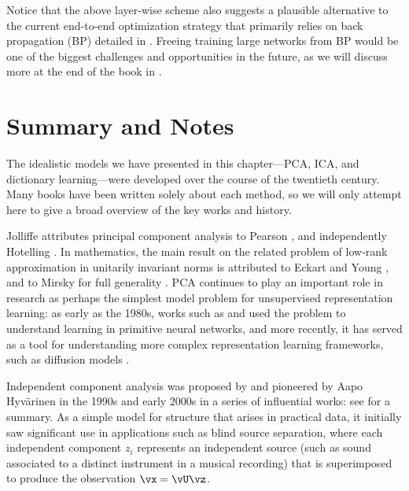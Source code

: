 \documentclass[../../book-main.tex]{subfiles}
\begin{document}
Notice that the above layer-wise scheme also suggests a plausible alternative to the current end-to-end optimization strategy that primarily relies on back propagation (BP) detailed in . Freeing training large networks from BP would be one of the biggest challenges and opportunities in the future, as we will discuss more at the end of the book in .


\section{Summary and Notes}

The idealistic models we have presented in this chapter---PCA, ICA, and
dictionary learning---were developed over the course of the twentieth century. 
Many books have been written solely about each method, so we will only attempt
here to give a broad overview of the key works and history.

Jolliffe \cite{Jolliffe1986} attributes principal component analysis to Pearson
\cite{Pearson1901}, and independently Hotelling \cite{Hotelling1933}. In
mathematics, the main result on the related problem of low-rank approximation in
unitarily invariant norms is attributed to Eckart and Young
\cite{Eckart1936-ep}, and to Mirsky for full generality \cite{Mirsky1960-ek}.
PCA continues to play an important role in research as perhaps the simplest
model problem for unsupervised representation learning: as early as the 1980s,
works such as \textcite{Oja1982SimplifiedNM} and \textcite{Baldi89} used the
problem to understand learning in primitive neural networks, and more recently,
it has served as a tool for understanding more complex representation learning
frameworks, such as diffusion models \cite{wang2024diffusion}.

Independent component analysis was proposed by \textcite{Ans-1985} and pioneered by
Aapo Hyv\"{a}rinen in the 1990s and early 2000s in a series of influential
works: see \textcite{Hyvrinen-2000} for a summary. As a simple model for
structure that arises in practical data, it initially saw significant use in
applications such as blind source separation, where each independent component
$z_i$ represents an independent source (such as sound associated to a distinct
instrument in a musical recording) that is superimposed to produce the
observation $\vx = \vU \vz$.
\end{document}

